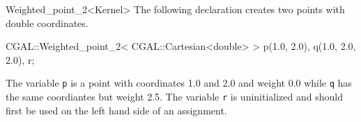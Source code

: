 \begin{ccRefClass} {Weighted_point_2<Kernel>}
The following declaration creates two points with  double coordinates.

\begin{cprog}

  CGAL::Weighted_point_2< CGAL::Cartesian<double> > p(1.0, 2.0), q(1.0, 2.0, 2.0), r;
\end{cprog} 

The variable \texttt{p} is a point with 
coordinates 1.0 and 2.0 and weight 0.0 while \texttt{q} has the same 
coordiantes but weight 2.5.
The variable {\tt r} is uninitialized and should first be used on 
the left hand side of an assignment. 

\ccSeeAlso
{} \\

\end{ccRefClass} 

